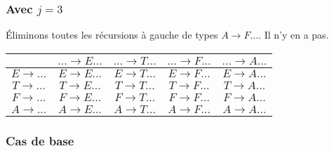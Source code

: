 \documentclass[class=article]{standalone}
\begin{document}
\subsubsection*{Avec $j = 3$}
Éliminons toutes les récursions à gauche de types $A \rightarrow F...$. Il n'y en a pas.
\begin{center}
    \begin{tabular}{c|c|c|c|c|}
        \cellcolor[HTML]{FFFFFF}                     & 
        \cellcolor[HTML]{FFFFFF} $... \rightarrow E...$ &
        \cellcolor[HTML]{FFFFFF} $... \rightarrow T...$ & 
        \cellcolor[HTML]{FFFFFF} $... \rightarrow F...$ & 
        \cellcolor[HTML]{FFFFFF} $... \rightarrow A...$ \\
    \hline
        \cellcolor[HTML]{FFFFFF} $E \rightarrow ...$ & 
        \cellcolor[HTML]{FF0000} $E \rightarrow E...$ & 
        \cellcolor[HTML]{ABFF00} $E \rightarrow T...$ & 
        \cellcolor[HTML]{ABFF00} $E \rightarrow F...$ & 
        \cellcolor[HTML]{ABFF00} $E \rightarrow A...$ \\
    \hline
        \cellcolor[HTML]{FFFFFF} $T \rightarrow ...$ & 
        \cellcolor[HTML]{FF0000} $T \rightarrow E...$ & 
        \cellcolor[HTML]{FF0000} $T \rightarrow T...$ & 
        \cellcolor[HTML]{ABFF00} $T \rightarrow F...$ &
        \cellcolor[HTML]{ABFF00} $T \rightarrow A...$ \\
    \hline
        \cellcolor[HTML]{FFFFFF} $F \rightarrow ...$ &
        \cellcolor[HTML]{FF0000} $F \rightarrow E...$ &
        \cellcolor[HTML]{FF0000} $F \rightarrow T...$ & 
        \cellcolor[HTML]{FF0000} $F \rightarrow F...$ & 
        \cellcolor[HTML]{ABFF00} $F \rightarrow A...$ \\
    \hline
        \cellcolor[HTML]{FFFFFF} $A \rightarrow ...$ & 
        \cellcolor[HTML]{FF0000} $A \rightarrow E...$ & 
        \cellcolor[HTML]{FF0000} $A \rightarrow T...$ & 
        \cellcolor[HTML]{FF0000} $A \rightarrow F...$ & 
        \cellcolor[HTML]{FFFFFF} $A \rightarrow A...$ \\
    \hline
    \end{tabular}
\end{center}

\subsubsection*{Cas de base}
\end{document}
